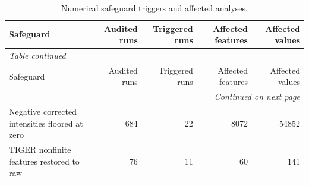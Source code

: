 \scriptsize
\begin{longtable}{lrrrr}
\caption{Numerical safeguard triggers and affected analyses.}\label{tab:supp_safeguards}\\
\toprule
Safeguard & Audited runs & Triggered runs & Affected features & Affected values \\
\midrule
\endfirsthead
\multicolumn{5}{l}{\textit{Table \thetable{} continued}}\\
\toprule
Safeguard & Audited runs & Triggered runs & Affected features & Affected values \\
\midrule
\endhead
\midrule
\multicolumn{5}{r}{\textit{Continued on next page}}\\
\endfoot
\bottomrule
\endlastfoot
Negative corrected intensities floored at zero & 684 & 22 & 8072 & 54852 \\
TIGER nonfinite features restored to raw & 76 & 11 & 60 & 141 \\
\end{longtable}
